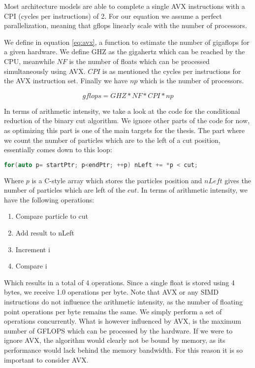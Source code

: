 \documentclass[]{article}
\begin{document}
Most architecture models are able to complete a single AVX instructions with a CPI (cycles per instructions) of 2. For our equation we assume a perfect parallelization, meaning that gflops linearly scale with the number of processors. 

We define in equation \ref{eq:avx}, a function to estimate the number of gigaflops for a given hardware. We define GHZ as the gigahertz which can be reached by the CPU, meanwhile $NF$ is the number of floats which can be processed simultaneously using AVX. $CPI$ is as mentioned the cycles per instructions for the AVX instruction set. Finally we have $np$ which is the number of processors.

\begin{center}
	\begin{equation}
		gflops = GHZ * NF * CPI * np
	\end{equation}
\label{eq:avx}
\end{center}

In terms of arithmetic intensity, we take a look at the code for the conditional reduction of the binary cut algorithm. We ignore other parts of the code for now, as optimizing this part is one of the main targets for the thesis. The part where we count the number of particles which are to the left of a cut position, essentially comes down to this loop:

\begin{lstlisting}[language=c++]
	for(auto p= startPtr; p<endPtr; ++p) nLeft += *p < cut;
\end{lstlisting}

Where $p$ is a C-style array which stores the particles position and $nLeft$ gives the number of particles which are left of the $cut$. In terms of arithmetic intensity, we have the following operations:

\begin{enumerate}
	\item Compare particle to cut
	\item Add result to nLeft
	\item Increment i
	\item Compare i
\end{enumerate}

Which results in a total of 4 operations. Since a single float is stored using 4 bytes, we receive 1.0 operations per byte. Note that AVX or any SIMD instructions do not influence the arithmetic intensity, as the number of floating point operations per byte remains the same. We simply perform a set of operations concurrently. What is however influenced by AVX, is the maximum number of GFLOPS which can be processed by the hardware. If we were to ignore AVX, the algorithm would clearly not be bound by memory, as its performance would lack behind the memory bandwidth. For this reason it is so important to consider AVX.
\end{document}
